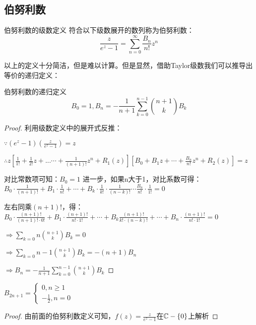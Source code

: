 \documentclass[12pt, a4paper, oneside, UTF8]{ctexbook}
\begin{document}
		\subsection{伯努利数}
		\begin{para}{0}
			\begin{defn}{伯努利数的级数定义}{}
				符合以下级数展开的数列称为伯努利数：
				\begin{equation}
					\frac{z}{e^z -1} = \sum_{n=0}^{\infty}\frac{B_n}{n!}z^n
				\end{equation}
			\end{defn}
			以上的定义十分简洁，但是难以计算。但是显然，借助Taylor级数我们可以推导出等价的递归定义：
			\begin{defn}{伯努利数的递归定义}{}
				\begin{equation}
					B_0=1,B_n=-\frac{1}{n+1}\sum\limits_{k=0}^{n-1}\binom{n+1}{k}B_{k}
				\end{equation}
			\end{defn}
			\begin{proof}
				利用级数定义中的展开式反推：
				
				$\because\left(e^z-1\right)\left(\frac{z}{e^z-1}\right)=z$
				
				$\therefore z\left[\frac{1}{1!}+\frac{1}{2!}z+...\cdots+\frac{1}{(n+1)!}z^n+R_1(z)\right]\left[B_0+B_1 z+\cdots+\frac{B_n}{n!}z^n+R_2(z)\right]=z$
				
				对比常数项可知：$B_0=1$
				进一步，如果n大于1，对比系数可得：
				$B_0\cdot\frac{1}{(n+1)!}+B_1\cdot\frac{1}{n!}+\cdots+B_k\cdot\frac{1}{k!}\cdot\frac{1}{(n-k)!}\cdots\frac{B_n}{n!}\cdot\frac{1}{1!}=0$
				
				左右同乘$(n+1)!$，得：
				$B_0\cdot\frac{(n+1)!}{(n+1)!\cdot 0!}+B_1\cdot\frac{(n+1)!}{n!\cdot 1!}+\cdots+B_k\frac{(n+1)!}{k!\cdot (n-k)!}+\cdots+B_n\cdot\frac{(n+1)!}{n!\cdot1!}=0$
				
				$\Rightarrow \sum\limits_{k=0}{n} \binom{n+1}{k}B_k=0$
				
				$\Rightarrow \sum\limits_{k=0}{n-1} \binom{n+1}{k}B_k=-(n+1)B_n$
				
				$\Rightarrow B_n=-\frac{1}{n+1}\sum\limits_{k=0}^{n-1}\binom{n+1}{k}B_{k}$
				
			\end{proof}
				\begin{para}{1}
					\begin{proposition}
						$B_{2n+1}=\begin{cases}
								0,n\geqslant 1 \\
								-\frac{1}{2},n=0 
							\end{cases}$
					\end{proposition}
					\begin{proof}
						由前面的伯努利数定义可知，$f(z)=\frac{z}{e^z-1}$在$\mathbb{C}-\{0\}$上解析
						

\end{proof}
\end{para}
\end{para}
\end{document}
